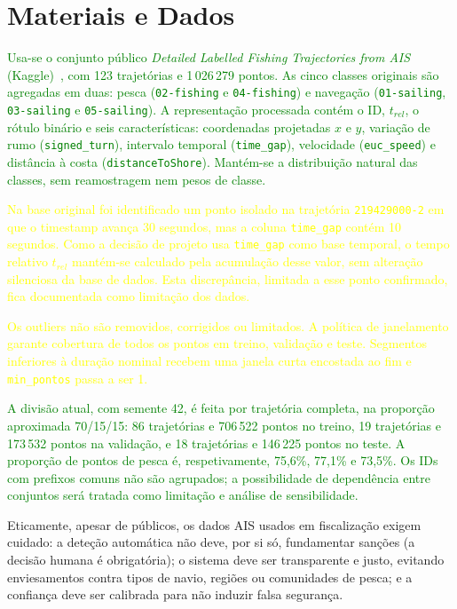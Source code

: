\documentclass{article}
\begin{document}
\section{Materiais e Dados}
\label{sec:materiais-dados}

\textcolor{green}{Usa-se o conjunto público \emph{Detailed Labelled Fishing Trajectories from AIS} (Kaggle)~\cite{kaggleAIS}, com 123 trajetórias e 1\,026\,279 pontos. As cinco classes originais são agregadas em duas: pesca (\texttt{02-fishing} e \texttt{04-fishing}) e navegação (\texttt{01-sailing}, \texttt{03-sailing} e \texttt{05-sailing}). A representação processada contém o ID, $t_{rel}$, o rótulo binário e seis características: coordenadas projetadas $x$ e $y$, variação de rumo (\texttt{signed\_turn}), intervalo temporal (\texttt{time\_gap}), velocidade (\texttt{euc\_speed}) e distância à costa (\texttt{distanceToShore}). Mantém-se a distribuição natural das classes, sem reamostragem nem pesos de classe.}

\textcolor{yellow}{Na base original foi identificado um ponto isolado na trajetória \texttt{219429000-2} em que o timestamp avança 30 segundos, mas a coluna \texttt{time\_gap} contém 10 segundos. Como a decisão de projeto usa \texttt{time\_gap} como base temporal, o tempo relativo $t_{rel}$ mant\'em-se calculado pela acumula\c{c}\~ao desse valor, sem altera\c{c}\~ao silenciosa da base de dados. Esta discrep\^ancia, limitada a esse ponto confirmado, fica documentada como limita\c{c}\~ao dos dados.}

\textcolor{yellow}{Os outliers não são removidos, corrigidos ou limitados. A política de janelamento garante cobertura de todos os pontos em treino, validação e teste. Segmentos inferiores à duração nominal recebem uma janela curta encostada ao fim e \texttt{min\_pontos} passa a ser 1.}

\textcolor{green}{A divisão atual, com semente 42, é feita por trajetória completa, na proporção aproximada 70/15/15: 86 trajetórias e 706\,522 pontos no treino, 19 trajetórias e 173\,532 pontos na validação, e 18 trajetórias e 146\,225 pontos no teste. A proporção de pontos de pesca é, respetivamente, 75,6\%, 77,1\% e 73,5\%. Os IDs com prefixos comuns não são agrupados; a possibilidade de dependência entre conjuntos será tratada como limitação e análise de sensibilidade.}

Eticamente, apesar de públicos, os dados AIS usados em fiscalização exigem cuidado: a deteção automática não deve, por si só, fundamentar sanções (a decisão humana é obrigatória); o sistema deve ser transparente e justo, evitando enviesamentos contra tipos de navio, regiões ou comunidades de pesca; e a confiança deve ser calibrada para não induzir falsa segurança.
\end{document}
